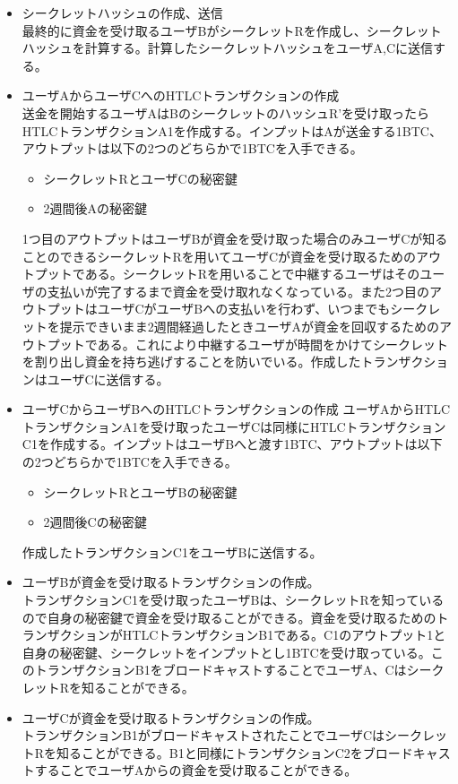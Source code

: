 \documentclass[12pt]{jarticle}
\begin{document}
\begin{itemize}
\item シークレットハッシュの作成、送信\\
最終的に資金を受け取るユーザBがシークレットRを作成し、シークレットハッシュを計算する。計算したシークレットハッシュをユーザA,Cに送信する。

\item ユーザAからユーザCへのHTLCトランザクションの作成\\
送金を開始するユーザAはBのシークレットのハッシュR'を受け取ったらHTLCトランザクションA1を作成する。インプットはAが送金する1BTC、アウトプットは以下の2つのどちらかで1BTCを入手できる。
\begin{itemize}
\item シークレットRとユーザCの秘密鍵
\item 2週間後Aの秘密鍵
\end{itemize}
1つ目のアウトプットはユーザBが資金を受け取った場合のみユーザCが知ることのできるシークレットRを用いてユーザCが資金を受け取るためのアウトプットである。シークレットRを用いることで中継するユーザはそのユーザの支払いが完了するまで資金を受け取れなくなっている。また2つ目のアウトプットはユーザCがユーザBへの支払いを行わず、いつまでもシークレットを提示できいまま2週間経過したときユーザAが資金を回収するためのアウトプットである。これにより中継するユーザが時間をかけてシークレットを割り出し資金を持ち逃げすることを防いでいる。作成したトランザクションはユーザCに送信する。

\item ユーザCからユーザBへのHTLCトランザクションの作成
ユーザAからHTLCトランザクションA1を受け取ったユーザCは同様にHTLCトランザクションC1を作成する。インプットはユーザBへと渡す1BTC、アウトプットは以下の2つどちらかで1BTCを入手できる。
\begin{itemize}
\item シークレットRとユーザBの秘密鍵
\item 2週間後Cの秘密鍵
\end{itemize}
作成したトランザクションC1をユーザBに送信する。

\item ユーザBが資金を受け取るトランザクションの作成。\\
トランザクションC1を受け取ったユーザBは、シークレットRを知っているので自身の秘密鍵で資金を受け取ることができる。資金を受け取るためのトランザクションがHTLCトランザクションB1である。C1のアウトプット1と自身の秘密鍵、シークレットをインプットとし1BTCを受け取っている。このトランザクションB1をブロードキャストすることでユーザA、CはシークレットRを知ることができる。

\item ユーザCが資金を受け取るトランザクションの作成。\\
トランザクションB1がブロードキャストされたことでユーザCはシークレットRを知ることができる。B1と同様にトランザクションC2をブロードキャストすることでユーザAからの資金を受け取ることができる。
\end{itemize}
\end{document}
